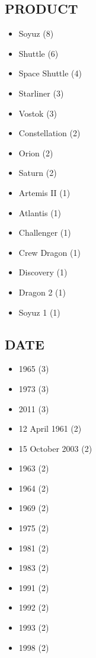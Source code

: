 \documentclass[12pt]{article}
\begin{document}
\subsection*{PRODUCT}
\begin{itemize}
\item Soyuz (8)
\item Shuttle (6)
\item Space Shuttle (4)
\item Starliner (3)
\item Vostok (3)
\item Constellation (2)
\item Orion (2)
\item Saturn (2)
\item Artemis II (1)
\item Atlantis (1)
\item Challenger (1)
\item Crew Dragon (1)
\item Discovery (1)
\item Dragon 2 (1)
\item Soyuz 1 (1)
\end{itemize}

\subsection*{DATE}
\begin{itemize}
\item 1965 (3)
\item 1973 (3)
\item 2011 (3)
\item 12 April 1961 (2)
\item 15 October 2003 (2)
\item 1963 (2)
\item 1964 (2)
\item 1969 (2)
\item 1975 (2)
\item 1981 (2)
\item 1983 (2)
\item 1991 (2)
\item 1992 (2)
\item 1993 (2)
\item 1998 (2)
\end{itemize}
\end{document}
